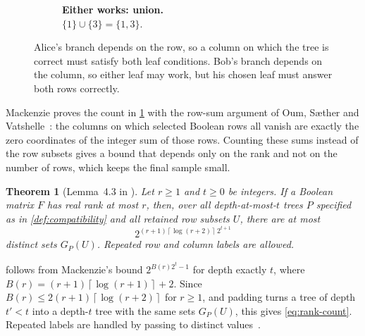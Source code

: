 \documentclass[11pt,letterpaper]{article} \usepackage[utf8]{inputenc}
\theoremstyle{plain} \newtheorem{theorem}{Theorem}[section]
\theoremstyle{definition} \newaliascnt{definition}{theorem}
\newcommand{\ceil}[1]{\left\lceil#1\right\rceil}
\begin{document}
\begin{figure}[H]
\begin{subfigure}[t]{.48\linewidth}
\caption{\textbf{Either works: union.}\\
$\{1\}\cup\{3\}=\{1,3\}$.}
\end{subfigure}
\caption{Alice's branch depends on the row, so a column on which the tree is correct must
satisfy both leaf conditions. Bob's branch depends on the column, so either
leaf may work, but his chosen leaf must answer both rows correctly.}
\label{fig:compatible-trees}
\end{figure}

Mackenzie proves the count in \cref{thm:rank-count} with the row-sum argument of Oum, S{\ae}ther and
Vatshelle~\cite[Theorem~4.2]{oum2014faster}: the columns on which selected
Boolean rows all vanish are exactly the zero coordinates of the integer sum of
those rows. Counting these sums instead of the row subsets gives a bound that depends
only on the rank and not on the number of rows, which keeps the final sample small.

\begin{theorem}[Lemma~4.3 in \cite{mackenzie2026condensation}]\label{thm:rank-count}
Let $r\ge1$ and $t\ge0$ be integers. If a Boolean matrix $F$ has real rank at most
$r$, then, over all depth-at-most-$t$ trees $P$ specified as in
\cref{def:compatibility} and all retained row subsets $U$, there are at most
\begin{equation}\label{eq:rank-count}
 2^{(r+1)\ceil{\log(r+2)}\,2^{t+1}}
\end{equation}
distinct sets $G_P(U)$. Repeated row and column labels are allowed.
\end{theorem}

 follows from Mackenzie's bound $2^{B(r)2^t-1}$ for depth exactly $t$, where
$B(r)=(r+1)\ceil{\log(r+1)}+2$. Since $B(r)\le2(r+1)\ceil{\log(r+2)}$ for
$r\ge1$, and padding turns a tree of depth $t'<t$ into a depth-$t$ tree with the
same sets $G_P(U)$, this gives \eqref{eq:rank-count}. Repeated labels are
handled by passing to distinct values~\cite[Section~2]{mackenzie2026condensation}.
\end{document}

